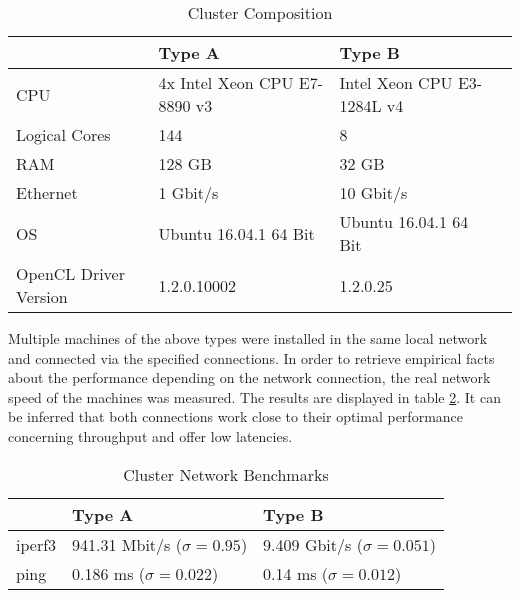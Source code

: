 \begin{table}[!htb]
	\centering
	\begin{adjustbox}{width=0.7\textwidth}
		\small
		\begin{tabular}{l | l | l | l}
			~                     & Type A                  	& Type B                  \\
			\hline
			CPU                   &  4x Intel Xeon CPU E7-8890 v3 	& Intel Xeon CPU E3-1284L v4 \\
			Logical Cores         &  144 	& 8 \\
			RAM                   &  128 GB                       	& 32 GB                       \\
			Ethernet	          &  1 Gbit/s                  	& 10 Gbit/s                  \\
			OS                    &  Ubuntu 16.04.1 64 Bit      	& Ubuntu 16.04.1 64 Bit      \\
			OpenCL Driver Version &  1.2.0.10002                   & 1.2.0.25                   \\
		\end{tabular}
	\end{adjustbox}

	\caption{Cluster Composition}
	\label{table:cluster_setup_1}
\end{table}

Multiple machines of the above types were installed in the same local network and connected via the specified connections. In order to retrieve empirical facts about the performance depending on the network connection, the real network speed of the machines was measured. The results are displayed in table \ref{table:cluster_interconnect_benchmarks}. It can be inferred that both connections work close to their optimal performance concerning throughput and offer low latencies.

\begin{table}[!htb]
	\centering
	\begin{adjustbox}{width=0.5\textwidth}
		\small
		\begin{tabular}{l | l | l}
			~                     & Type A                 			& Type B                  \\
			\hline
			iperf3                & 941.31 Mbit/s ($\sigma = 0.95$) 	& 9.409 Gbit/s ($\sigma = 0.051$) \\
			ping                  & 0.186 ms ($\sigma = 0.022$)  		& 0.14 ms ($\sigma = 0.012$)  \\
		\end{tabular}
	\end{adjustbox}

	\caption{Cluster Network Benchmarks}
	\label{table:cluster_interconnect_benchmarks}
\end{table}

